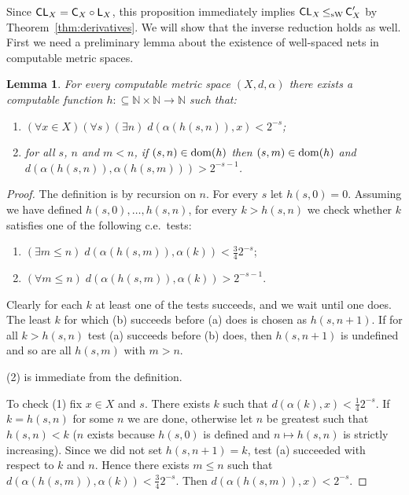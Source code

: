 \documentclass[a4paper]{amsart}
\def\IN{{\mathbb{N}}}
\def\In{\subseteq}
\def\dom{{\rm dom}}
\def\C{\mbox{\rm\sffamily C}}
\def\L{\text{\rm\sffamily L}}
\def\CL{\text{\rm\sffamily CL}}
\def\leqSW{\mathop{\leq_{\mathrm{sW}}}}
\newtheorem{lemma}[theorem]{Lemma}
\theoremstyle{definition}
\begin{document}
Since $\CL_X=\C_X\circ\L_X$, this proposition immediately implies $\CL_X\leqSW\C_X'$
by Theorem~\ref{thm:derivatives}. We will show that the inverse reduction holds as well.
First we need a preliminary lemma about the existence of well-spaced
nets in computable metric spaces.

\begin{lemma}
\label{lem:nets}
For every computable metric space $(X,d,\alpha)$ there exists a
computable function $h:\In\IN\times\IN\to\IN$ such that:
\begin{enumerate}
  \item $(\forall x \in X)(\forall s)(\exists n)\;
      d(\alpha(h(s,n)), x) < 2^{-s}$;
  \item for all $s$, $n$ and $m<n$, if $(s,n) \in \dom(h)$ then
      $(s,m) \in \dom(h)$ and $d(\alpha(h(s,n)), \alpha(h(s,m)))
      > 2^{-s-1}$.
\end{enumerate}
\end{lemma}
\begin{proof}
The definition is by recursion on $n$. For every $s$ let $h(s,0)=0$.
Assuming we have defined $h(s,0), \dots, h(s,n)$, for every $k>h(s,n)$ we
check whether $k$ satisfies one of the following c.e.\ tests:
\begin{enumerate}[\quad(a)]
  \item $(\exists m \leq n)\; d(\alpha(h(s,m)), \alpha(k)) < \frac34
      2^{-s}$;
  \item $(\forall m \leq n)\; d(\alpha(h(s,m)), \alpha(k)) >
      2^{-s-1}$.
\end{enumerate}
Clearly for each $k$ at least one of the tests succeeds, and we wait
until one does. The least $k$ for which (b) succeeds before (a) does
is chosen as $h(s,n+1)$. If for all $k>h(s,n)$ test (a) succeeds before (b) does,
then $h(s,n+1)$ is undefined and so are all $h(s,m)$ with $m>n$.

(2) is immediate from the definition.

To check (1) fix $x \in X$ and $s$. There exists $k$ such that
$d(\alpha(k),x) < \frac14 2^{-s}$. If $k = h(s,n)$ for some $n$ we
are done, otherwise let $n$ be greatest such that $h(s,n) < k$ ($n$
exists because $h(s,0)$ is defined and $n \mapsto h(s,n)$ is strictly
increasing). Since we did not set $h(s,n+1)=k$, test (a) succeeded
with respect to $k$ and $n$. Hence there exists $m\leq n$ such that
$d(\alpha(h(s,m)), \alpha(k)) < \frac34 2^{-s}$. Then
$d(\alpha(h(s,m)), x) < 2^{-s}$.
\end{proof}
\end{document}
